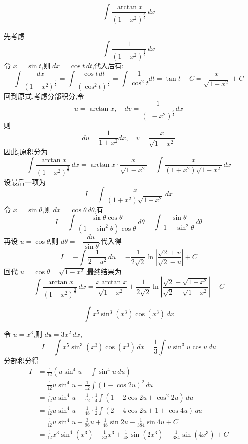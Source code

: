 \begin{questions}
    \question 
    \[
    \int \frac{\arctan x}{(1-x^2)^{\frac{3}{2}}} \, dx
    \]
    \begin{solution}
        先考虑
        \[
        \int \frac{1}{(1 - x^2)^{\frac{3}{2}}}\, dx
        \]
        令 \( x = \sin t \),则 \( dx = \cos t\, dt \),代入后有:
        \[
        \int \frac{dx}{(1 - x^2)^{\frac{3}{2}}} = \int \frac{\cos t\, dt}{(\cos^2 t)^{\frac{3}{2}}} = \int \frac{1}{\cos^2 t} dt = \tan t + C = \frac{x}{\sqrt{1 - x^2}} + C
        \]
        回到原式,考虑分部积分,令
        \[
        u = \arctan x, \quad dv = \frac{1}{(1 - x^2)^{\frac{3}{2}}} dx
        \]
        则
        \[
        du = \frac{1}{1 + x^2} dx, \quad v = \frac{x}{\sqrt{1 - x^2}}
        \]
        因此,原积分为
        \[
        \int \frac{\arctan x}{(1 - x^2)^{\frac{3}{2}}}\, dx = \arctan x \cdot \frac{x}{\sqrt{1 - x^2}} - \int \frac{x}{(1 + x^2) \sqrt{1 - x^2}}\, dx
        \]
        设最后一项为
        \[
        I = \int \frac{x}{(1 + x^2) \sqrt{1 - x^2}}\, dx
        \]
        令 \( x = \sin \theta \),则 \( dx = \cos \theta\, d\theta \),有
        \[
        I = \int \frac{\sin \theta \cos \theta}{(1 + \sin^2 \theta)\cos \theta}\, d\theta = \int \frac{\sin \theta}{1 + \sin^2 \theta}\, d\theta
        \]
        再设 \( u = \cos \theta \),则 \( d\theta = -\dfrac{du}{\sin \theta} \),代入得
        \[
        I = -\int \frac{1}{2 - u^2}\, du= -\frac{1}{2\sqrt{2}} \ln \left| \frac{\sqrt{2} + u}{\sqrt{2} - u} \right| + C
        \]
        回代 \( u = \cos \theta = \sqrt{1 - x^2} \),最终结果为
        \[
        \int \frac{\arctan x}{(1 - x^2)^{\frac{3}{2}}}\, dx = \frac{x \arctan x}{\sqrt{1 - x^2}} + \frac{1}{2\sqrt{2}} \ln \left| \frac{\sqrt{2} + \sqrt{1 - x^2}}{\sqrt{2} - \sqrt{1 - x^2}} \right| + C
        \]
    \end{solution}
    
    \question
    \[
    \int x^5 \sin^3 (x^3) \cos (x^3) \, dx
    \]
    \begin{solution}
        令 $u = x^3$,则 $du = 3x^2 \, dx$,
        \[
        I = \int x^5 \sin^3 (x^3) \cos (x^3) \, dx = \frac{1}{3} \int u \sin^3 u \cos u \, du 
        \]
        分部积分得
        \begin{align*}
        I &= \frac{1}{12} \left( u \sin^4 u - \int \sin^4 u \, du \right) \\
        &= \frac{1}{12} u \sin^4 u - \frac{1}{12} \int (1 - \cos 2u)^2 \, du \\
        &= \frac{1}{12} u \sin^4 u - \frac{1}{12} \cdot \frac{1}{4} \int (1 - 2\cos 2u + \cos^2 2u) \, du  \\
        &= \frac{1}{12} u \sin^4 u - \frac{1}{48} \cdot \frac{1}{2} \int (2 - 4\cos 2u + 1+\cos 4u) \, du  \\
        &= \frac{1}{12} u \sin^4 u - \frac{3}{96} u + \frac{1}{48} \sin 2u - \frac{1}{384} \sin 4u + C \\
        &= \frac{1}{12} x^3 \sin^4 (x^3) - \frac{1}{32} x^3 + \frac{1}{48} \sin (2x^3) - \frac{1}{384} \sin (4x^3) + C 
        \end{align*}
    \end{solution}


\end{questions}
